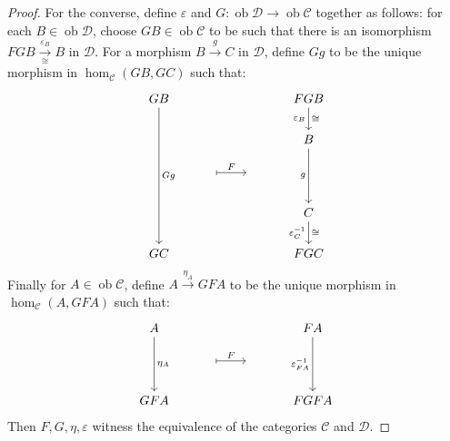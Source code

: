 \documentclass[a4paper,11pt]{article}
\theoremstyle{break_italics}
\theoremstyle{break_upright}
\theoremstyle{remark}
\newcommand{\ob}{\operatorname{ob}}
\newcommand{\C}{\mathcal{C}}
\newcommand{\D}{\mathcal{D}}
\begin{document}
\begin{proof}
For the converse, define $\varepsilon$ and $G \colon \ob\D\to\ob\C$ together as follows: for each $B \in \ob\D$, choose $GB \in \ob\C$ to be such that there is an isomorphism $FGB \xrightarrow[\cong]{\varepsilon_B} B$ in $\D$. For a morphism $B \xrightarrow{g} C$ in $\D$, define $Gg$ to be the unique morphism in $\hom_\C(GB,GC)$ such that:
\[
\begin{tikzcd}
GB \arrow[dddd, "Gg"] &                            &    & FGB \arrow[d,"\cong", "\varepsilon_B"']    \\
                      &                            &    & B \arrow[dd, "g"']                 \\
                      & {} \arrow[r, "F", maps to] & {} &                                    \\
                      &                            &    & C \arrow[d,"\cong", "\varepsilon_C^{-1}"'] \\
GC                    &                            &    & FGC                               
\end{tikzcd}
\]
Finally for $A\in\ob\C$, define $A \xrightarrow{\eta_A} GFA$ to be the unique morphism in $\hom_\C(A,GFA)$ such that:
\[
\begin{tikzcd}
A \arrow[dd, "\eta_A"] &                            &    & FA \arrow[dd, "\varepsilon_{FA}^{-1}"'] \\
                       & {} \arrow[r, "F", maps to] & {} &                                         \\
GFA                    &                            &    & FGFA                                   
\end{tikzcd}
\]
Then $F,G,\eta,\varepsilon$ witness the equivalence of the categories $\C$ and $\D$.
\end{proof}
\end{document}
